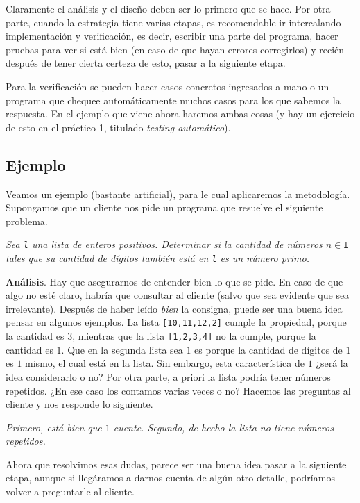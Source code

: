 \documentclass[a4paper, 12pt]{report}
\theoremstyle{definition}
\begin{document}
Claramente el análisis y el diseño deben ser lo primero que se hace. Por otra parte, cuando la estrategia tiene varias etapas, es recomendable ir intercalando implementación y verificación, es decir, escribir una parte del programa, hacer pruebas para ver si está bien (en caso de que hayan errores corregirlos) y recién después de tener cierta certeza de esto, pasar a la siguiente etapa.

Para la verificación se pueden hacer casos concretos ingresados a mano o un programa que chequee automáticamente muchos casos para los que sabemos la respuesta. En el ejemplo que viene ahora haremos ambas cosas (y hay un ejercicio de esto en el práctico 1, titulado {\sl testing automático}).

\subsection{Ejemplo}

Veamos un ejemplo (bastante artificial), para le cual aplicaremos la metodología. Supongamos que un cliente nos pide un programa que resuelve el siguiente problema.

{\it Sea {\tt l} una lista de enteros positivos. Determinar si la cantidad de números $n\in\mathtt{l}$ tales que su cantidad de dígitos también está en {\tt l} es un número primo.}

{\bf Análisis}. Hay que asegurarnos de entender bien lo que se pide. En caso de que algo no esté claro, habría que consultar al cliente (salvo que sea evidente que sea irrelevante). Después de haber leído {\sl bien} la consigna, puede ser una  buena idea pensar en algunos ejemplos. La lista {\tt [10,11,12,2]} cumple la propiedad, porque la cantidad es $3$, mientras que la lista {\tt [1,2,3,4]} no la cumple, porque la cantidad es $1$. Que en la segunda lista sea $1$ es porque la cantidad de dígitos de $1$ es $1$ mismo, el cual está en la lista. Sin embargo, esta característica de $1$ ¿será la idea considerarlo o no? Por otra parte, a priori la lista podría tener números repetidos. ¿En ese caso los contamos varias veces o no? Hacemos las preguntas al cliente y nos responde lo siguiente.

{\it Primero, está bien que $1$ cuente. Segundo, de hecho la lista no tiene números repetidos.}

Ahora que resolvimos esas dudas, parece ser una buena idea pasar a la siguiente etapa, aunque si llegáramos a darnos cuenta de algún otro detalle, podríamos volver a preguntarle al cliente.
\end{document}
